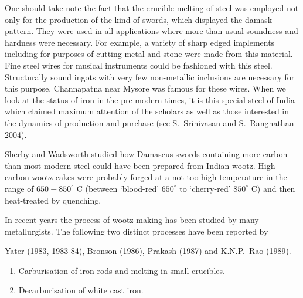 One should take note the fact that the crucible melting of steel was employed not only for the production of the kind of swords, which displayed the damask pattern. They were used in all applications where more than usual soundness and hardness were necessary. For example, a variety of sharp edged implements including for purposes of cutting metal and stone were made from this material. Fine steel wires for musical instruments could be fashioned with this steel. Structurally sound ingots with very few non-metallic inclusions are necessary for this purpose. Channapatna near Mysore was famous for these wires. When we look at the status of iron in the pre-modern times, it is this special steel of India which claimed maximum attention of the scholars as well as those interested in the dynamics of production and purchase (see S.~Srinivasan and S.~Rangnathan 2004).

Sherby and Wadsworth studied how Damascus swords containing more carbon than most modern steel could have been prepared from Indian wootz. High-carbon wootz cakes were probably forged at a not-too-high temperature in the range of $650-850^\circ$ C (between ‘blood-red’ $650^\circ$ to ‘cherry-red’ $850^\circ$ C) and then heat-treated by quenching. 

In recent years the process of wootz making has been studied by many metallurgists. The following two distinct processes have been reported by 

Yater (1983, 1983-84), Bronson (1986), Prakash (1987) and K.N.P.~Rao (1989).


\vspace{-.2cm}

\begin{enumerate}
\item Carburisation of iron rods and melting in small crucibles.
\item Decarburisation of white cast iron.
\end{enumerate}

\vspace{-.2cm}

